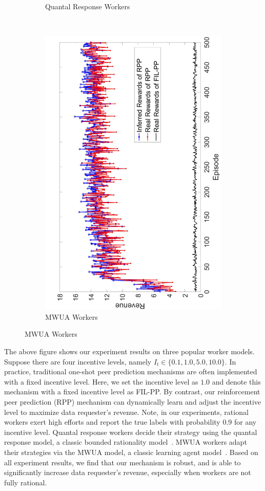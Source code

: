 \documentclass{article}
\begin{document}
\begin{figure}[htb]
\begin{subfigure}[t]{0.3\textwidth}
        \caption{\label{E2}  Quantal Response Workers}
    \end{subfigure}
    ~
    \begin{subfigure}[t]{0.3\textwidth}
        \centering
        \includegraphics[height=\textwidth, angle=-90]{image/3}
        \caption{\label{E3}  MWUA Workers}
    \end{subfigure}    
    \vspace{-1mm}
\end{figure}
The above figure %
shows our experiment results on three popular worker models.
Suppose there are four incentive levels, namely $I_t\in \{0.1, 1.0, 5.0, 10.0\}$.
In practice, traditional one-shot peer prediction mechanisms are often implemented with a fixed incentive level.
Here, we set the incentive level as $1.0$ and denote this mechanism with a fixed incentive level as FIL-PP.
By contrast, our reinforcement peer prediction (RPP) mechanism can dynamically learn and adjust the incentive level to maximize data requester's revenue.
Note, in our experiments, rational workers exert  high efforts and report the true labels with probability $0.9$ for any incentive level.
Quantal response workers decide their strategy using the quantal response model, a classic bounded rationality model~\cite{mckelvey1995quantal}.
MWUA workers adapt their strategies via the MWUA model, a classic learning agent model~\cite{chastain2014algorithms}.
Based on all experiment results, we find that our mechanism is robust, and is able to significantly increase data requester's revenue, especially when workers are not fully rational.



\newpage


\end{document}
